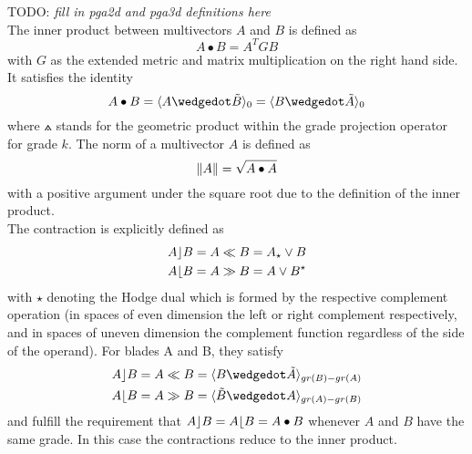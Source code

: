 TODO: \emph{fill in pga2d and pga3d definitions here} \\


The inner product between multivectors $A$ and $B$ is defined as
\begin{equation}
    A \bullet B = A^{T} G B
    \label{eg:inner_product_metric}
\end{equation}
with $G$ as the extended metric and matrix multiplication on the right hand side. It
satisfies the identity
\begin{equation}
    A \bullet B  = \grprj{A \wedgedot \tilde{B}}{0} = \grprj{ B \wedgedot \tilde{A} }{0}
    \label{eq:inner_product_link_to_gpr}
\end{equation}
where $\wedgedot$ stands for the geometric product within the grade projection operator
 for grade $k$. The norm of a multivector $A$ is defined as
\begin{equation}
    \left \lVert {A} \right \rVert = \sqrt{A \bullet A}
    \label{eq:norm_mv}
\end{equation}
with a positive argument under the square root due to the definition of the inner product.
\\

The contraction is explicitly defined as
\begin{subequations}
    \begin{align}
    A \rfloor B & = A \ll B = A_{\star} \vee B
    \label{eq:lcontr} \\
    A \lfloor B & = A \gg B = A \vee B^{\star}
    \label{eq:rcontr}
    \end{align}
\end{subequations}
with $\star$ denoting the Hodge dual which is formed by the respective complement
operation (in spaces of even dimension the left or right complement respectively, and in
spaces of uneven dimension the complement function regardless of the side of the operand).
For blades A and B, they satisfy
\begin{subequations}
    \begin{align}
    A \lcontr B &  = A \ll B = \grprj{B \wedgedot \tilde{A}}{gr(B)-gr(A)}
    \label{eq:lcontr_gpr} \\
    A \rcontr B & = A \gg B = \grprj{\tilde{B} \wedgedot A}{gr(A)-gr(B)}
    \label{eq:rcontr_gpr}
    \end{align}
\end{subequations}
and fulfill the requirement that $A \rfloor B = A \lfloor B = A \bullet B$ whenever $A$
and $B$ have the same grade. In this case the contractions reduce to the inner product. \\


